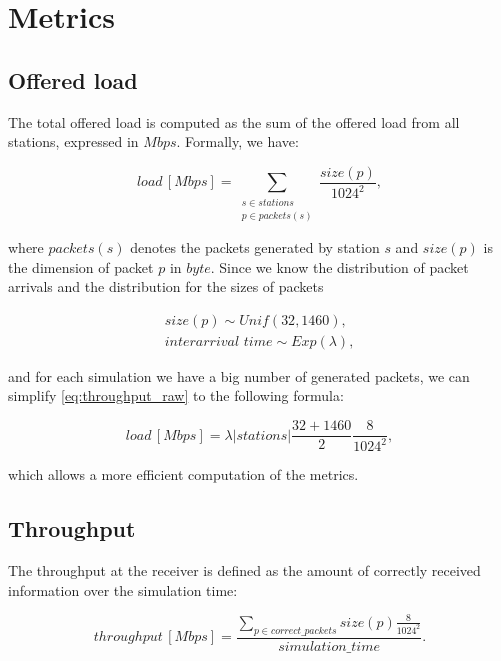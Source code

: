 \section{Metrics}
\label{sec:metrics}

\subsection{Offered load}
The total offered load is computed as the sum of the offered load from all stations, expressed in $Mbps$.
Formally, we have:

\begin{equation}
    load \, [Mbps] = \sum_{\substack{s \in stations \\ p \in packets(s)}} \frac{size(p)}{1024 ^ 2},
    \label{eq:throughput_raw}
\end{equation}

where $packets(s)$ denotes the packets generated by station $s$ and $size(p)$ is the dimension of packet $p$ in $byte$.
Since we know the distribution of packet arrivals and the distribution for the sizes of packets

\begin{equation*}
    \begin{gathered}
        size(p) \sim Unif(32, 1460), \\
        interarrival \,\, time \sim Exp(\lambda),
    \end{gathered}
\end{equation*}

and for each simulation we have a big number of generated packets, we can simplify \cref{eq:throughput_raw} to the following formula:

\begin{equation*}
    load \, [Mbps] = \lambda |stations| \frac{32+1460}{2} \frac{8}{1024 ^ 2},
\end{equation*}

which allows a more efficient computation of the metrics.


\subsection{Throughput}
The throughput at the receiver is defined as the amount of correctly received information over the simulation time:

\begin{equation}
    throughput \, [Mbps] = \frac{\sum_{p \in correct\_packets} size(p) \frac{8}{1024^2}}{simulation\_time} .
\end{equation}


